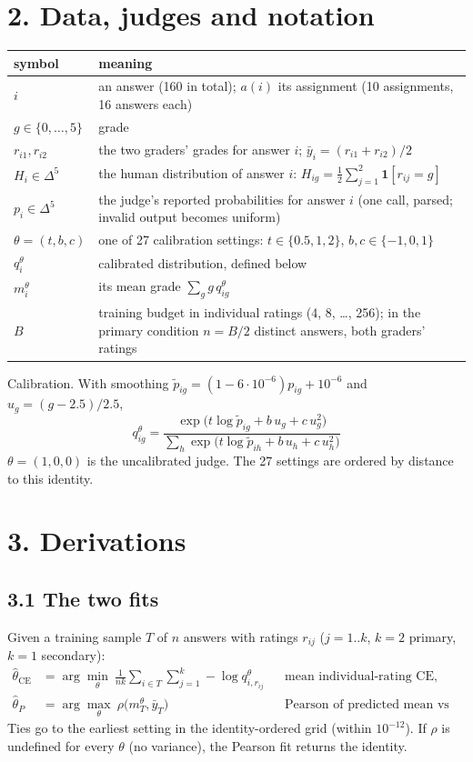 \documentclass[10pt]{article}
\newcommand{\CE}{\mathrm{CE}}
\begin{document}
\section*{2. Data, judges and notation}
\begin{tabular}{p{2.6cm}p{12.4cm}}
\toprule symbol & meaning \\ \midrule
$i$ & an answer (160 in total); $a(i)$ its assignment (10 assignments, 16 answers each) \\
$g\in\{0,\dots,5\}$ & grade \\
$r_{i1},r_{i2}$ & the two graders' grades for answer $i$; $\bar y_i=(r_{i1}+r_{i2})/2$ \\
$H_i\in\Delta^5$ & the human distribution of answer $i$: $H_{ig}=\tfrac12\sum_{j=1}^2\mathbf 1[r_{ij}=g]$ \\
$p_i\in\Delta^5$ & the judge's reported probabilities for answer $i$ (one call, parsed; invalid output becomes uniform) \\
$\theta=(t,b,c)$ & one of 27 calibration settings: $t\in\{0.5,1,2\}$, $b,c\in\{-1,0,1\}$ \\
$q^{\theta}_i$ & calibrated distribution, defined below \\
$m^\theta_i$ & its mean grade $\sum_g g\,q^\theta_{ig}$ \\
$B$ & training budget in individual ratings (4, 8, \dots, 256); in the primary condition $n=B/2$ distinct answers, both graders' ratings \\
\bottomrule
\end{tabular}

Calibration. With smoothing $\tilde p_{ig}=(1-6\cdot10^{-6})p_{ig}+10^{-6}$ and $u_g=(g-2.5)/2.5$,
\[
\boxed{\,q^{\theta}_{ig}=\frac{\exp\!\big(t\log\tilde p_{ig}+b\,u_g+c\,u_g^2\big)}{\sum_{h}\exp\!\big(t\log\tilde p_{ih}+b\,u_h+c\,u_h^2\big)}\,}
\]
$\theta=(1,0,0)$ is the uncalibrated judge. The 27 settings are ordered by distance to this identity.

\section*{3. Derivations}
\subsection*{3.1 The two fits}
Given a training sample $T$ of $n$ answers with ratings $r_{ij}$ ($j=1..k$, $k=2$ primary, $k=1$ secondary):
\begin{align}
\hat\theta_{\CE}&=\arg\min_\theta\ \frac{1}{nk}\sum_{i\in T}\sum_{j=1}^{k}-\log q^\theta_{i,r_{ij}} &&\text{mean individual-rating CE},\\
\hat\theta_{P}&=\arg\max_\theta\ \rho\big(m^\theta_T,\bar y_T\big) &&\text{Pearson of predicted mean vs observed mean grade.}
\end{align}
Ties go to the earliest setting in the identity-ordered grid (within $10^{-12}$). If $\rho$ is undefined for every $\theta$ (no variance), the Pearson fit returns the identity.
\end{document}
